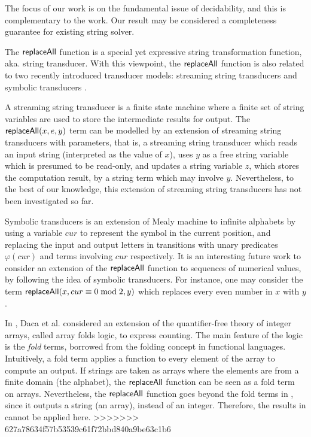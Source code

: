 The focus of our work is on the fundamental issue of decidability, and this is complementary to the work. Our result may be considered a completeness guarantee for existing string solver. 
 
The $\mathsf{replaceAll}$ function is a special yet expressive string transformation function, aka. string transducer. With this viewpoint, 
the $\mathsf{replaceAll}$ function is also related to two recently introduced transducer models: streaming string transducers \cite{AC10} and symbolic transducers \cite{symbolic-transducer}. 

A streaming string transducer is a finite state machine where  a finite set of string variables are used to store the intermediate results for output. The $\mathsf{replaceAll}(x, e, y)$ term can be modelled by an extension of streaming string transducers with parameters, that is, a streaming string transducer which reads an input string (interpreted as the value of $x$), uses $y$ as a free string variable which is presumed to be read-only, and updates a string variable $z$, which stores the computation result, by a string term which may involve $y$. Nevertheless, to the best of our knowledge, this extension of streaming string transducers has not been investigated so far. 

Symbolic transducers is an extension of Mealy machine to infinite alphabets by using a variable $cur$ to represent the symbol in the current position, and replacing the input and output letters in transitions with unary predicates $\varphi(cur)$ and terms involving $cur$ respectively. It is an interesting future work to consider an extension of the $\mathsf{replaceAll}$ function to sequences of numerical values, by following the idea of symbolic transducers. For instance, one may consider the term $\mathsf{replaceAll}(x, cur \equiv 0 \bmod 2, y)$ which replaces every even number in $x$ with $y$.

In \cite{DHK16}, Daca et al. considered an extension of the quantifier-free theory of integer arrays, called array folds logic, to express counting. The main feature of the logic is the \emph{fold} terms, borrowed from the folding concept in functional languages. Intuitively, a fold term applies a function to every element of the array to compute an output. If strings are taken as arrays where the elements are from a finite domain (the alphabet), the $\mathsf{replaceAll}$ function can be seen as a fold term on arrays. Nevertheless, the $\mathsf{replaceAll}$ function goes beyond the fold terms in \cite{DHK16}, since it outputs a string (an array), instead of an integer. Therefore, the results in \cite{DHK16} cannot be applied here.
>>>>>>> 627a78634f57b53539c61f72bbd840a9be63c1b6
